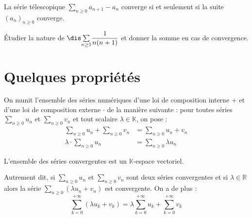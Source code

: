 \documentclass[a4paper,10pt]{report}
\newcommand{\Sum}[2]{\ensuremath{\textstyle{\sum\limits_{#1}^{#2}}}}
\begin{document}
\begin{prop}
La série télescopique $\Sum{n\geq 0}{} a_{n+1}-a_n$ converge si et seulement si la suite $(a_n)_{n \geq 0}$ converge.
\end{prop}

\begin{preuve} 
\vspace{3cm}
\end{preuve}

\medskip

\begin{exa} Étudier la nature de $\dis \Sum{n\geq 1}{} \dfrac{1}{n(n+1)}$ et donner la somme en cas de convergence.

%
\end{exa}


\section{Quelques propriétés}

\noindent On munit l'ensemble des séries numériques d'une loi de composition interne $+$ et d'une loi de composition externe $\cdot$ de la manière suivante : pour toutes séries $\Sum{n \geq 0}{} u_n$ et $\Sum{n \geq 0}{} v_n$ et tout scalaire $\lambda \in \mathbb{K}$, on pose :
\begin{align*}
\Sum{n \geq 0}{} u_n + \Sum{n \geq 0}{} v_n  & = \Sum{n \geq 0}{} u_n+v_n \\
\lambda \cdot \Sum{n \geq 0}{} u_n & = \Sum{n \geq 0}{} \lambda u_n
\end{align*}



\begin{prop}
L'ensemble des séries convergentes est un $\mathbb{K}$-espace vectoriel.

\noindent Autrement dit, si $\Sum{n \geq 0}{} u_n$ et $\Sum{n \geq 0}{} v_n$ sont deux séries convergentes et si $\lambda \in \mathbb{R}$ alors la série $\Sum{n \geq 0}{} (\lambda u_n +v_n)$ est convergente. On a de plus : 
$$ \sum_{k=0}^{+ \infty} (\lambda u_k + v_k) = \lambda  \sum_{k=0}^{+ \infty}  u_k +  \sum_{k=0}^{+ \infty}  v_k$$
\end{prop}
\end{document}
